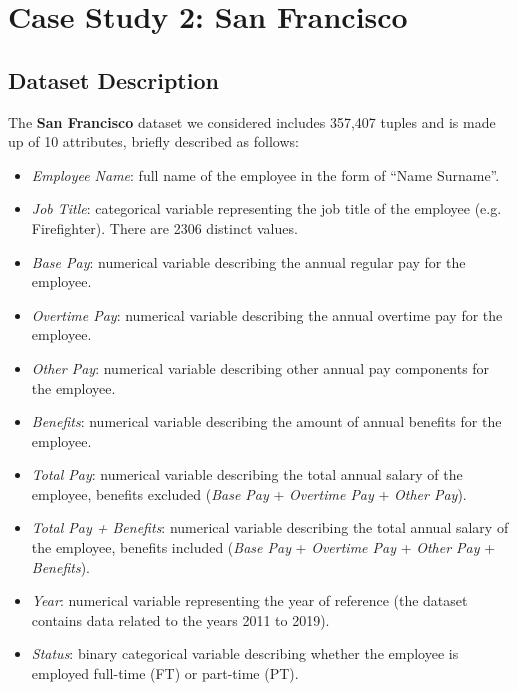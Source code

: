 \section{Case Study 2: San Francisco}
\subsection{Dataset Description}
The \textbf{San Francisco} dataset we considered includes 357,407 tuples and is made up of 10 attributes, briefly described as follows:
\begin{itemize}
\item \textit{Employee Name}: full name of the employee in the form of ``Name Surname''.
\item \textit{Job Title}: categorical variable representing the job title of the employee (e.g. Firefighter). There are 2306 distinct values.
\item \textit{Base Pay}: numerical variable describing the annual regular pay for the employee.
\item \textit{Overtime Pay}: numerical variable describing the annual overtime pay for the employee.
\item \textit{Other Pay}: numerical variable describing other annual pay components for the employee.
\item \textit{Benefits}: numerical variable describing the amount of annual benefits for the employee.
\item \textit{Total Pay}: numerical variable describing the total annual salary of the employee, benefits excluded (\textit{Base Pay} + \textit{Overtime Pay} + \textit{Other Pay}).
\item \textit{Total Pay + Benefits}: numerical variable describing the total annual salary of the employee, benefits included (\textit{Base Pay} + \textit{Overtime Pay} + \textit{Other Pay} + \textit{Benefits}).
\item \textit{Year}: numerical variable representing the year of reference (the dataset contains data related to the years 2011 to 2019).
\item \textit{Status}: binary categorical variable describing whether the employee is employed full-time (FT) or part-time (PT).
\end{itemize}


